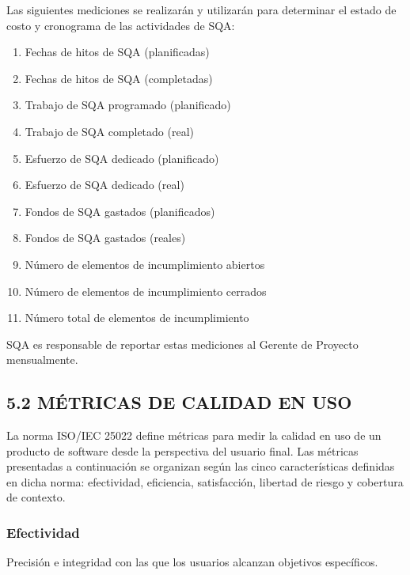 Las siguientes mediciones se realizarán y utilizarán para determinar el estado de costo y cronograma de las actividades de SQA:
\begin{enumerate}
    \item Fechas de hitos de SQA (planificadas)
    \item Fechas de hitos de SQA (completadas)
    \item Trabajo de SQA programado (planificado)
    \item Trabajo de SQA completado (real)
    \item Esfuerzo de SQA dedicado (planificado)
    \item Esfuerzo de SQA dedicado (real)
    \item Fondos de SQA gastados (planificados)
    \item Fondos de SQA gastados (reales)
    \item Número de elementos de incumplimiento abiertos
    \item Número de elementos de incumplimiento cerrados
    \item Número total de elementos de incumplimiento
\end{enumerate}

SQA es responsable de reportar estas mediciones al Gerente de Proyecto mensualmente.

\subsection{5.2 MÉTRICAS DE CALIDAD EN USO }

La norma ISO/IEC 25022 define métricas para medir la calidad en uso de un producto de software desde la perspectiva del usuario final. Las métricas presentadas a continuación se organizan según las cinco características definidas en dicha norma: efectividad, eficiencia, satisfacción, libertad de riesgo y cobertura de contexto.

\subsubsection{Efectividad}

Precisión e integridad con las que los usuarios alcanzan objetivos específicos.

